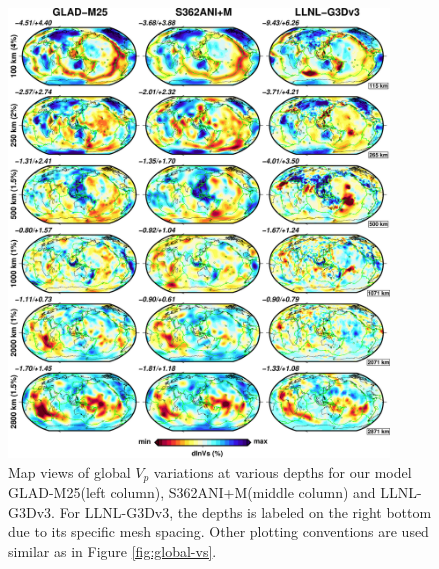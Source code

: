 \documentclass[extra,mreferee]{gji}
\begin{document}
\begin{figure}
\includegraphics[width=0.9\textwidth]{figures/depth_slice/globe_vp_S362ANI-LLNL.pdf}
\caption{Map views of global $V_p$ variations at various depths for our model GLAD-M25(left column), S362ANI+M(middle column) and LLNL-G3Dv3\cite{}. For LLNL-G3Dv3, the depths is labeled on the right bottom due to its specific mesh spacing. Other plotting conventions are used similar as in Figure \ref{fig:global-vs}.}
\label{fig:global-vp}
\centering
\end{figure}
\end{document}
